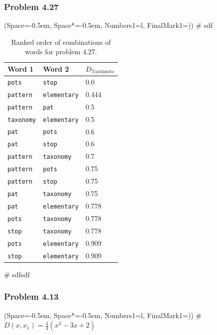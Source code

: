 \documentclass[12pt, a4paper]{article}
\newcommand{\listSpace}{-0.5em}%
\begin{document}
\subsubsection*{Problem 4.27}
\begin{easylist}[enumerate]
\ListProperties(Space=\listSpace, Space*=\listSpace, Numbers1=l, FinalMark1={)})
# sdf

\begin{table}[ht!]
	\centering
	\caption{Ranked order of combinations of words for problem 4.27.}
	\begin{tabular}{@{}lll@{}} \toprule
	Word 1	& Word 2 & $D_\text{Tantimoto}$ \\ \midrule
	\texttt{pots} & \texttt{stop} &  0.0 \\ 
	\texttt{pattern} & \texttt{elementary} &  0.444 \\ 
	\texttt{pattern} & \texttt{pat} &  0.5 \\ 
	\texttt{taxonomy} & \texttt{elementary} &  0.5 \\ 
	\texttt{pat} & \texttt{pots} &  0.6 \\ 
	\texttt{pat} & \texttt{stop} &  0.6 \\ 
	\texttt{pattern} & \texttt{taxonomy} &  0.7 \\ 
	\texttt{pattern} & \texttt{pots} &  0.75 \\ 
	\texttt{pattern} & \texttt{stop} &  0.75 \\ 
	\texttt{pat} & \texttt{taxonomy} &  0.75 \\ 
	\texttt{pat} & \texttt{elementary} &  0.778 \\ 
	\texttt{pots} & \texttt{taxonomy} &  0.778 \\ 
	\texttt{stop} & \texttt{taxonomy} &  0.778 \\ 
	\texttt{pots} & \texttt{elementary} &  0.909 \\ 
	\texttt{stop} & \texttt{elementary} &  0.909 \\  \bottomrule
	\end{tabular}
	\label{table:problem_4_17}
\end{table}


# sdfsdf
\end{easylist}


\subsubsection*{Problem 4.13}
\begin{easylist}[enumerate]
	\ListProperties(Space=\listSpace, Space*=\listSpace, Numbers1=l, FinalMark1={)})
	# $D(x, x_1) = \frac{4}{3} \left( x^3 - 3x + 2	 \right)$
\end{easylist}
\end{document}
